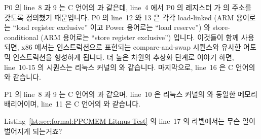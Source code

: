 P0 의 line~8 과 9 는 C 언어의  과 같은데, line~4 에서 P0 의 레지스터
 가  의 주소를 갖도록 정의했기 때문입니다.
P0 의 line~12 와 13 은 각각 load-linked (ARM 용어로는 ``load register
exclusive'' 이고 Power 용어로는 ``load reserve'') 와 store-conditional (ARM
용어로는 ``store register exclusive'') 입니다.
이것들이 함께 사용되면, x86 에서는  인스트럭션으로 표현되는
compare-and-swap 시퀀스와 유사한 어토믹 인스트럭션을 형성하게 됩니다.
더 높은 차원의 추상화 단계로 이야기 하면, line~10-15 의 시퀀스는 리눅스 커널의
 와 같습니다.
마지막으로, line~16 은 C 언어의  와 같습니다.

P1 의 line~8 과 9 는 C 언어의  과 같으며, line~10 은 리눅스 커널의
 와 동일한 메모리 배리어이며, line~11 은 C 언어의  와
같습니다.
\iffalse

P0's lines~8 and~9 are equivalent to the C statement \co{x=1} because
line~4 defines P0's register \co{r2} to be the address of \co{x}. P0's
lines~12 and~13 are the mnemonics for load-linked (``load register
exclusive'' in ARM parlance and ``load reserve'' in Power parlance)
and store-conditional (``store register exclusive'' in ARM parlance),
respectively. When these are used together, they form an atomic
instruction sequence, roughly similar to the compare-and-swap sequences
exemplified by the x86 \co{lock;cmpxchg} instruction. Moving to a higher
level of abstraction, the sequence from lines~10-15 is equivalent to
the Linux kernel's \co{atomic_add_return(&z, 0)}. Finally, line~16 is
roughly equivalent to the C statement \co{r3=y}.

P1's lines~8 and~9 are equivalent to the C statement \co{y=1}, line~10
is a memory barrier, equivalent to the Linux kernel statement \co{smp_mb()},
and line~11 is equivalent to the C statement \co{r3=x}.
\fi

\QuickQuiz{}
	Listing~\ref{lst:sec:formal:PPCMEM Litmus Test} 의 line~17 의 
	라벨에서는 무슨 일이 벌어지게 되는거죠?
	\iffalse

